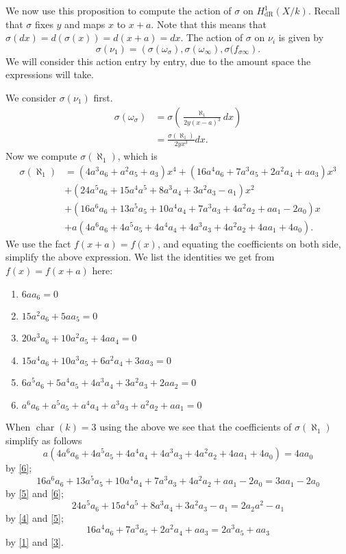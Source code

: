 \documentclass[draft, 11pt]{article} %
\theoremstyle{plain}
\theoremstyle{remark}
\newcommand{\derhamhone}{H_{\text {dR}}^1(X/k)}
\DeclareMathOperator{\cha}{char}
\begin{document}
We now use this proposition to compute the action of $\sigma $ on $\derhamhone$.
Recall that $\sigma$ fixes $y$ and maps $x$ to $x+a$. 
Note that this means that $\sigma(dx) = d(\sigma(x)) = d(x+a) = dx$.
The action of $\sigma$ on $\nu_i$ is given by
\begin{equation*}
\sigma(\nu_1) = \left( \sigma( \omega_{\sigma}), \sigma(\omega_{\infty}), \sigma( f_{\sigma \infty}\right).
\end{equation*}
We will consider this action entry by entry, due to the amount space the expressions will take.

We consider $\sigma(\nu_1)$ first.
\begin{align*}
\sigma( \omega_{\sigma}) & = \sigma \left( \frac{\aleph_1}{2y(x-a)^3} dx \right) \\
& = \frac{\sigma(\aleph_1)}{2yx^3}dx.
\end{align*}
Now we compute $\sigma(\aleph_1)$, which is
\begin{align*}
\sigma(\aleph_1) & = (4a^3a_6+a^2a_5+a_3)x^4 + (16a^4a_6+7a^3a_5+2a^2a_4+aa_3)x^3 \\
& + (24a^5a_6+15a^4a^5+8a^3a_4+3a^2a_3-a_1)x^2 \\
& + (16a^6a_6+13a^5a_5+10a^4a_4+7a^3a_3+4a^2a_2+aa_1-2a_0)x \\
& + a(4a^6a_6+4a^5a_5+4a^4a_4+4a^3a_3+4a^2a_2+4aa_1+4a_0).
\end{align*}
We use the fact $f(x+a) = f(x)$, and equating the coefficients on both side, simplify the above expression.
We list the identities we get from $f(x) = f(x+a)$ here:
\begin{enumerate}
\item \label{1} $6aa_6=0$
\item \label{2} $15a^2a_6+5aa_5 = 0$
\item \label{3} $20a^3a_6+10a^2a_5+4aa_4 = 0$
\item \label{4} $15a^4a_6 + 10a^3a_5 + 6a^2a_4+3aa_3= 0$
\item \label{5} $6a^5a_6 + 5a^4a_5+4a^3a_4+3a^2a_3+2aa_2= 0$
\item \label{6} $a^6a_6+a^5a_5+a^4a_4+a^3a_3+a^2a_2+aa_1 = 0$
\end{enumerate}
When $\cha (k) =3$ using the above we see that the coefficients of $\sigma(\aleph_1)$ simplify as follows
\begin{equation*}
 a(4a^6a_6+4a^5a_5+4a^4a_4+4a^3a_3+4a^2a_2+4aa_1+4a_0) =  4aa_0
\end{equation*}
by \ref{6};
\[
16a^6a_6+13a^5a_5+10a^4a_4+7a^3a_3+4a^2a_2+aa_1-2a_0 = 3aa_1 -2a_0
\]
by \ref{5} and \ref{6};
\[
24a^5a_6+15a^4a^5+8a^3a_4+3a^2a_3-a_1 = 2a_2a^2-a_1
\]
by \ref{4} and \ref{5};
\[
16a^4a_6+7a^3a_5+2a^2a_4+aa_3 = 2a^3a_5 +aa_3
\]
by \ref{1} and \ref{3}.
\end{document}
